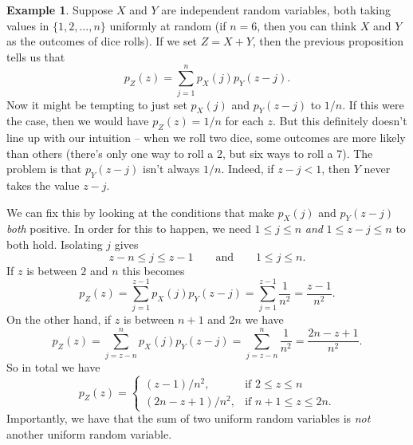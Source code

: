 \documentclass[12pt]{article}
\theoremstyle{plain}
\theoremstyle{definition}
\newtheorem{example}[theorem]{Example}
\theoremstyle{remark}
\begin{document}
\begin{example}
    Suppose $X$ and $Y$ are independent random variables, both taking values in $\{1, 2, \ldots, n\}$ uniformly at random (if $n=6$, then you can think $X$ and $Y$ as the outcomes of dice rolls).
    If we set $Z = X+Y$, then the previous proposition tells us that
    \[
        p_Z(z) = \sum_{j = 1}^np_X(j)p_Y(z-j).
    \]
    Now it might be tempting to just set $p_X(j)$ and $p_Y(z-j)$ to $1/n$.
    If this were the case, then we would have $p_Z(z) = 1/n$ for each $z$.
    But this definitely doesn't line up with our intuition -- when we roll two dice, some outcomes are more likely than others (there's only one way to roll a 2, but six ways to roll a 7).
    The problem is that $p_Y(z-j)$ isn't always $1/n$.
    Indeed, if $z-j < 1$, then $Y$ never takes the value $z-j$.

    We can fix this by looking at the conditions that make $p_X(j)$ and $p_Y(z-j)$ \emph{both} positive.
    In order for this to happen, we need $1\leq j\leq n$ \emph{and} $1\leq z-j\leq n$ to both hold.
    Isolating $j$ gives
    \[
        z-n \leq j\leq z-1 \qquad\text{and}\qquad 1\leq j\leq n.
    \]
    If $z$ is between $2$ and $n$ this becomes
    \[
        p_Z(z) = \sum_{j=1}^{z-1}p_X(j)p_Y(z-j) = \sum_{j=1}^{z-1}\frac{1}{n^2} = \frac{z-1}{n^2}. 
    \]
    On the other hand, if $z$ is between $n+1$ and $2n$ we have
    \[
        p_Z(z) = \sum_{j=z-n}^n p_X(j)p_Y(z-j) = \sum_{j=z-n}^n\frac{1}{n^2} = \frac{2n-z+1}{n^2}.
    \]
    So in total we have
    \[
        p_Z(z) = \begin{cases}
            (z-1)/n^2,&\text{if }2\leq z \leq n\\
            (2n-z+1)/n^2,&\text{if }n+1\leq z\leq 2n.
        \end{cases}
    \]
    Importantly, we have that the sum of two uniform random variables is \emph{not} another uniform random variable.
\end{example}
\end{document}
